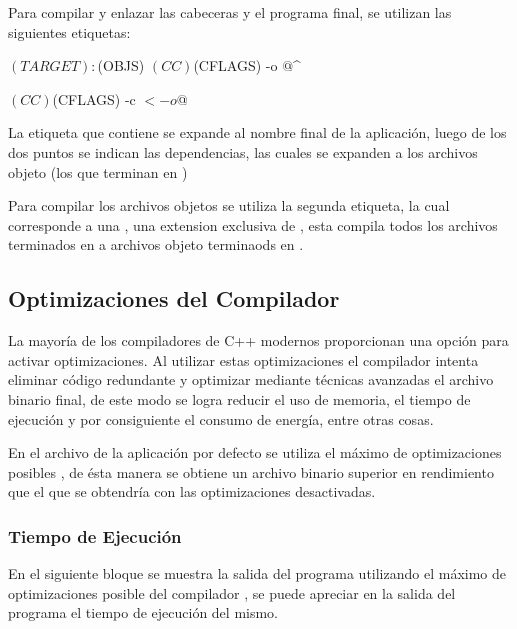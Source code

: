 \documentclass[12pt]{article}
\newenvironment{fullgrayverb}
{\verbbox}
{\endverbbox\par\colorbox{gray!25}{\parbox{\textwidth}{\theverbbox}}\par}
\begin{document}
Para compilar y enlazar las cabeceras y el programa final, se utilizan las
siguientes etiquetas:

\begin{fullgrayverb}[\mbox{}]
$(TARGET): $(OBJS)
    $(CC) $(CFLAGS) -o $@ $^

    $(CC) $(CFLAGS) -c $< -o $@
\end{fullgrayverb}

La etiqueta que contiene  se expande al nombre final de la
aplicación, luego de los dos puntos se indican las dependencias, las cuales se
expanden a los archivos objeto (los que terminan en )

Para compilar los archivos objetos se utiliza la segunda etiqueta, la cual
corresponde a una , una extension exclusiva de , 
esta  compila todos los archivos terminados en  a
archivos objeto terminaods en .

\subsection{Optimizaciones del Compilador}

La mayoría de los compiladores de C++ modernos proporcionan una opción para
activar optimizaciones. Al utilizar estas optimizaciones el compilador
intenta eliminar código redundante y optimizar mediante técnicas avanzadas el
archivo binario final, de este modo se logra reducir el uso de memoria, el
tiempo de ejecución y por consiguiente el consumo de energía, entre otras cosas.

En el archivo  de la aplicación por defecto se utiliza el máximo
de optimizaciones posibles , de ésta manera se obtiene un archivo
binario superior en rendimiento que el que se obtendría con las optimizaciones
desactivadas.


\subsubsection{Tiempo de Ejecución}

En el siguiente bloque se muestra la salida del programa utilizando el máximo de
optimizaciones posible del compilador , se puede apreciar en la salida
del programa el tiempo de ejecución del mismo.
\end{document}
